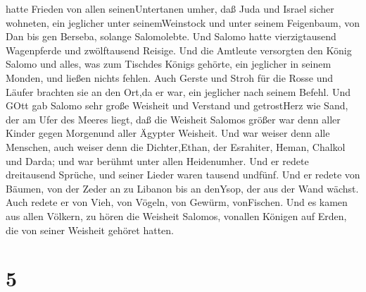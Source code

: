 hatte Frieden von allen seinenUntertanen umher,  daß Juda
und Israel sicher wohneten, ein jeglicher unter seinemWeinstock und
unter seinem Feigenbaum, von Dan bis gen Berseba, solange Salomolebte.
 Und Salomo hatte vierzigtausend Wagenpferde und
zwölftausend Reisige.  Und die Amtleute versorgten den
König Salomo und alles, was zum Tischdes Königs gehörte, ein jeglicher
in seinem Monden, und ließen nichts fehlen.  Auch Gerste
und Stroh für die Rosse und Läufer brachten sie an den Ort,da er war,
ein jeglicher nach seinem Befehl.  Und GOtt gab Salomo sehr
große Weisheit und Verstand und getrostHerz wie Sand, der am Ufer des
Meeres liegt,  daß die Weisheit Salomos größer war denn
aller Kinder gegen Morgenund aller Ägypter Weisheit.  Und
war weiser denn alle Menschen, auch weiser denn die Dichter,Ethan, der
Esrahiter, Heman, Chalkol und Darda; und war berühmt unter allen
Heidenumher.  Und er redete dreitausend Sprüche, und seiner
Lieder waren tausend undfünf.  Und er redete von Bäumen,
von der Zeder an zu Libanon bis an denYsop, der aus der Wand wächst.
Auch redete er von Vieh, von Vögeln, von Gewürm, vonFischen.
 Und es kamen aus allen Völkern, zu hören die Weisheit
Salomos, vonallen Königen auf Erden, die von seiner Weisheit gehöret
hatten.

\hypertarget{section-4}{%
\section{5}\label{section-4}}

